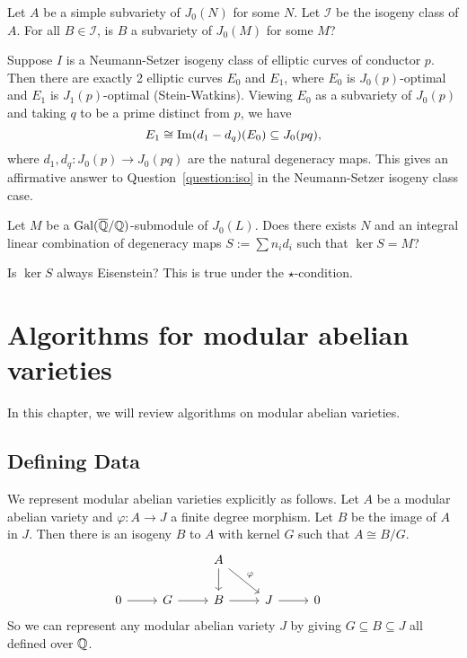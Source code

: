 \documentclass[11pt, proquest]{uwthesis}
\begin{document}
\begin{question}
    \label{question:iso}
    Let $A$ be a simple subvariety of $J_0(N)$ for some $N$. Let $\mathcal{I}$
    be the isogeny class of $A$. For all $B\in \mathcal{I}$, is $B$ a
    subvariety of $J_0(M)$ for some $M$?
\end{question}

\begin{example}
    Suppose $I$ is a Neumann-Setzer isogeny class of elliptic curves of
    conductor $p$. Then there are exactly 2 elliptic curves $E_0$ and $E_1$,
    where $E_0$ is $J_0(p)$-optimal and $E_1$ is $J_1(p)$-optimal
    (Stein-Watkins). Viewing $E_0$ as a subvariety of $J_0(p)$ and taking $q$
    to be a prime distinct from $p$, we have
    \[
        E_1 \cong \operatorname{Im} (d_1-d_q)(E_0)\subseteq J_0(pq),
    \]
    where $d_1, d_q:J_0(p)\to J_0(pq)$ are the natural degeneracy maps. This
    gives an affirmative answer to Question~\ref{question:iso} in the
    Neumann-Setzer isogeny class case.
\end{example}


\begin{question}
    Let $M$ be a $\operatorname{Gal}(\overline{\mathbb{Q}}/\mathbb{Q})$-submodule of $J_0(L)$. Does there exists
    $N$ and an integral linear combination of degeneracy maps $S:=\sum n_i d_i$
    such that $\ker S=M$?
\end{question}

\begin{question}
    Is $\ker S$ always Eisenstein? This is true under the $\star$-condition.
\end{question}

\chapter{Algorithms for modular abelian varieties}%
\label{chap:algorithms}


In this chapter, we will review algorithms on modular abelian varieties.

\section{Defining Data}%
\label{sec:defining_data}

We represent modular abelian varieties explicitly as follows. Let $A$ be a
modular abelian variety and $\varphi:A\to J$ a finite degree morphism. Let
$B$ be the image of $A$ in $J$. Then there is an isogeny $B$ to $A$ with kernel
$G$ such that $A\cong B/G$.
\begin{equation}
    \label{eq:defining_data}
    \begin{tikzcd}
        &
        &
        A \arrow[d]\arrow[dr,"\varphi"] &
        &
        &
        \\
        0 \arrow[r] &
        G \arrow[r] &
        B \arrow[r] &
        J \arrow[r] &
        0
    \end{tikzcd}
\end{equation}
So we can represent any modular abelian variety $J$ by giving $G\subseteq
B\subseteq J$ all defined over $\mathbb{Q}$.
\end{document}
